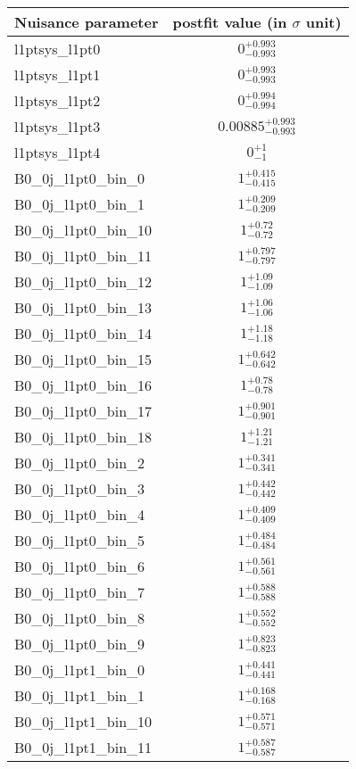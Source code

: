 
\begin{tabular}{|l|c|}
\hline
Nuisance parameter & postfit value (in $\sigma$ unit) \\\hline
l1ptsys\_l1pt0 & $0^{+0.993}_{-0.993}$ \\
l1ptsys\_l1pt1 & $0^{+0.993}_{-0.993}$ \\
l1ptsys\_l1pt2 & $0^{+0.994}_{-0.994}$ \\
l1ptsys\_l1pt3 & $0.00885^{+0.993}_{-0.993}$ \\
l1ptsys\_l1pt4 & $0^{+1}_{-1}$ \\
B0\_0j\_l1pt0\_bin\_0 & $1^{+0.415}_{-0.415}$ \\
B0\_0j\_l1pt0\_bin\_1 & $1^{+0.209}_{-0.209}$ \\
B0\_0j\_l1pt0\_bin\_10 & $1^{+0.72}_{-0.72}$ \\
B0\_0j\_l1pt0\_bin\_11 & $1^{+0.797}_{-0.797}$ \\
B0\_0j\_l1pt0\_bin\_12 & $1^{+1.09}_{-1.09}$ \\
B0\_0j\_l1pt0\_bin\_13 & $1^{+1.06}_{-1.06}$ \\
B0\_0j\_l1pt0\_bin\_14 & $1^{+1.18}_{-1.18}$ \\
B0\_0j\_l1pt0\_bin\_15 & $1^{+0.642}_{-0.642}$ \\
B0\_0j\_l1pt0\_bin\_16 & $1^{+0.78}_{-0.78}$ \\
B0\_0j\_l1pt0\_bin\_17 & $1^{+0.901}_{-0.901}$ \\
B0\_0j\_l1pt0\_bin\_18 & $1^{+1.21}_{-1.21}$ \\
B0\_0j\_l1pt0\_bin\_2 & $1^{+0.341}_{-0.341}$ \\
B0\_0j\_l1pt0\_bin\_3 & $1^{+0.442}_{-0.442}$ \\
B0\_0j\_l1pt0\_bin\_4 & $1^{+0.409}_{-0.409}$ \\
B0\_0j\_l1pt0\_bin\_5 & $1^{+0.484}_{-0.484}$ \\
B0\_0j\_l1pt0\_bin\_6 & $1^{+0.561}_{-0.561}$ \\
B0\_0j\_l1pt0\_bin\_7 & $1^{+0.588}_{-0.588}$ \\
B0\_0j\_l1pt0\_bin\_8 & $1^{+0.552}_{-0.552}$ \\
B0\_0j\_l1pt0\_bin\_9 & $1^{+0.823}_{-0.823}$ \\
B0\_0j\_l1pt1\_bin\_0 & $1^{+0.441}_{-0.441}$ \\
B0\_0j\_l1pt1\_bin\_1 & $1^{+0.168}_{-0.168}$ \\
B0\_0j\_l1pt1\_bin\_10 & $1^{+0.571}_{-0.571}$ \\
B0\_0j\_l1pt1\_bin\_11 & $1^{+0.587}_{-0.587}$ \\

\end{tabular}
